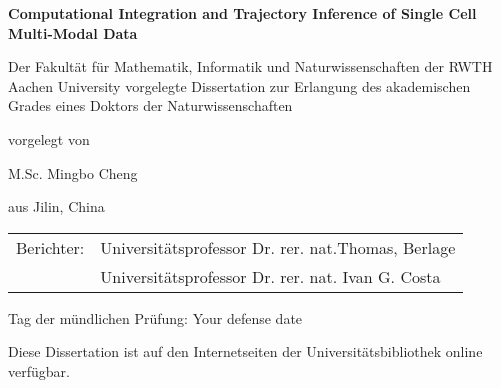 \begin{titlepage}
\large
\begin{center}

\begin{doublespacing} 

\vspace*{1cm}

{\Large{\textbf{Computational Integration and Trajectory Inference of Single Cell Multi-Modal Data}}}


\vspace{2cm}

\begin{minipage}[b]{14cm}
\centering
Der Fakultät für Mathematik, Informatik und Naturwissenschaften der RWTH
Aachen University vorgelegte Dissertation zur Erlangung des akademischen
Grades eines Doktors der Naturwissenschaften
\end{minipage}

\vspace{2cm}

vorgelegt von

M.Sc. Mingbo Cheng


aus Jilin, China

\end{doublespacing} 
\end{center}

\pagestyle{empty}


\vspace{5cm}
\noindent
\begin{tabular}{@{}ll}
Berichter:
	& Universitätsprofessor Dr. rer. nat.Thomas, Berlage \\
	& Universitätsprofessor Dr. rer. nat. Ivan G. Costa
\end{tabular}

\vspace*{\fill}
\noindent
Tag der m\"undlichen Pr\"ufung: Your defense date

\noindent
Diese Dissertation ist auf den Internetseiten der Universitätsbibliothek online verf\"ugbar.
\cleardoublepage
\end{titlepage}


